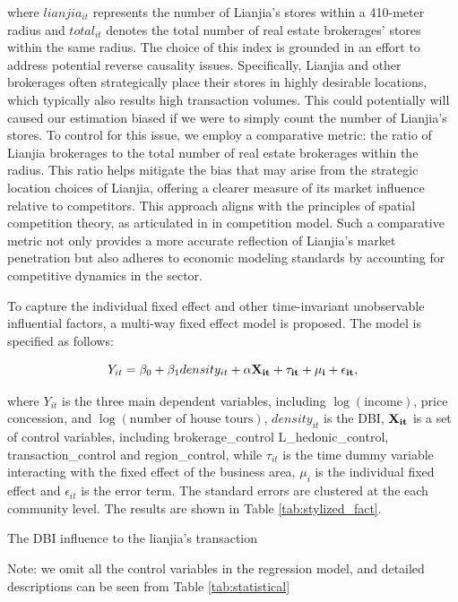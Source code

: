 \documentclass[12pt]{article}
\begin{document}
where $lianjia_{it}$ represents the number of Lianjia's stores within a 410-meter radius and $total_{it}$ denotes the total number of real estate brokerages' stores within the same radius. The choice of this index is grounded in an effort to address potential reverse causality issues. Specifically, Lianjia and other brokerages often strategically place their stores in highly desirable locations, which typically also results high transaction volumes. This could potentially will caused our estimation biased if we were to simply count the number of Lianjia's stores. To control for this issue, we employ a comparative metric: the ratio of Lianjia brokerages to the total number of real estate brokerages within the radius. This ratio helps mitigate the bias that may arise from the strategic location choices of Lianjia, offering a clearer measure of its market influence relative to competitors. This approach aligns with the principles of spatial competition theory, as articulated in \citep{hotelling_stability_1929, daspremont_hotellings_1979} in competition model. Such a comparative metric not only provides a more accurate reflection of Lianjia's market penetration but also adheres to economic modeling standards by accounting for competitive dynamics in the sector.

To capture the individual fixed effect and other time-invariant unobservable influential factors, a multi-way fixed effect model is proposed. The model is specified as follows: 

\begin{equation}
  Y_{it} = \beta_0 + \beta_1 density_{it} + \bf{\alpha} \bf{X}_{it} + \tau_{it} + \mu_i + \epsilon_{it}, \label{eq:multi-way-fe}
\end{equation}

where $Y_{it}$ is the three main dependent variables, including $\log(\text{income})$, price concession, and $\log(\text{number of house tours})$, $density_{it}$ is the DBI, $\bf{X}_{it}$ is a set of control variables, including brokerage\_control L\_hedonic\_control, transaction\_control and region\_control, while $\tau_{it}$ is the time dummy variable interacting with the fixed effect of the business area, $\mu_i$ is the individual fixed effect and $\epsilon_{it}$ is the error term. The standard errors are clustered at the each community level. The results are shown in Table \ref{tab:stylized_fact}.

\begin{table}[htb!]
    \centering
    \begin{scriptsize}
    
    \caption{The DBI influence to the lianjia's transaction}

    Note: we omit all the control variables in the regression model, and detailed descriptions can be seen from Table \ref{tab:statistical}
    \label{tab:stylized_fact}
    \end{scriptsize}
\end{table}
\end{document}
